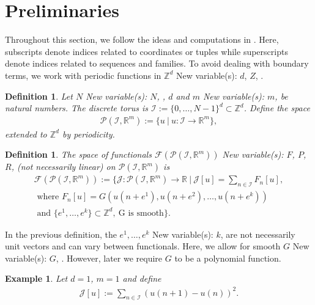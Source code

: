 \documentclass[sigconf,twocolumn]{acmart}
\newcommand{\1}{{\chi}}
\numberwithin{equation}{section}
\theoremstyle{thmlemcorr}
\numberwithin{theorem}{section}
\theoremstyle{thmlemcorr*}
\theoremstyle{defi}
\newtheorem{definition}[theorem]{Definition}
\theoremstyle{remexample}
\newtheorem{example}[theorem]{Example}
\theoremstyle{ass}
\begin{document}
\section{Preliminaries}
\label{assp}
Throughout this section, we follow the ideas and computations in \cite{gomes20}.
Here, subscripts denote indices related to coordinates or tuples while superscripts denote indices related to sequences and families.
To avoid dealing with boundary terms, we work with periodic functions in \({\mathbb{Z}}^d\)
{\color{blue} New variable(s): \(d\), \(Z\),  }
.
\begin{definition}
	Let \(N\)
{\color{blue} New variable(s): \(N\),  }
, \(d\) and \(m\)
{\color{blue} New variable(s): \(m\),  }
 be natural numbers. The \emph{discrete torus} is \({\mathcal{I}}:=\{0,\ldots,N-1\}^d\subset {\mathbb{Z}}^d\). Define the space
	\begin{gather*}
		\mathcal{P}({\mathcal{I}},{\mathbb{R}}^m):=\{u\ |\ u:{\mathcal{I}}\rightarrow{\mathbb{R}}^m\},
	\end{gather*}
	extended to \({\mathbb{Z}}^d\) by periodicity.
\end{definition}
\begin{definition}
	The space of functionals \(\mathcal{F}(\mathcal{P}({\mathcal{I}},{\mathbb{R}}^m))\)
{\color{blue} New variable(s): \(F\), \(P\), \(R\),  }
 (not necessarily linear) on \(\mathcal{P}({\mathcal{I}},{\mathbb{R}}^m)\) is
\begin{gather*}
	\mathcal{F}(\mathcal{P}({\mathcal{I}},{\mathbb{R}}^m)):= \Bigg\{\mathcal{J}:\mathcal{P}({\mathcal{I}},{\mathbb{R}}^m)\to {\mathbb{R}}\ \Bigg|\ \mathcal{J}[u]=\sum_{n\in{\mathcal{I}}}F_n[u],\\
	\text{ where }
	F_n[u]=G(u(n+e^1),u(n+e^2),\ldots,u(n+e^k))\\
	\text{ and }\{e^1,\ldots,e^k\}\subset{\mathbb{Z}}^d,\ \text{G is smooth}
		\Bigg\}.
\end{gather*}
\end{definition}
In the previous definition, the \(e^1,\ldots,e^k\)
{\color{blue} New variable(s): \(k\),  }
 are not necessarily unit vectors and can vary between functionals. Here, we allow for smooth \(G\)
{\color{blue} New variable(s): \(G\),  }
. However, later we require \(G\) to be a polynomial function.
\begin{example}
	\label{functional1}
	Let \(d=1\), \(m=1\) and define
	\begin{gather*}
		\mathcal{J}[u]:=\sum_{n\in{\mathcal{I}}}(u(n+1)-u(n))^2.
	\end{gather*}
\end{example}
\end{document}
